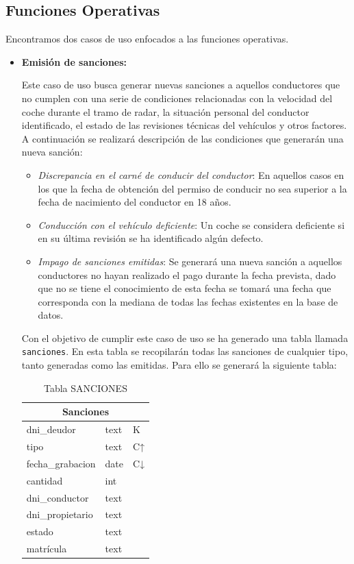 \documentclass[]{article}
\begin{document}
\subsection{Funciones Operativas}
\label{subsec:funciones_operativas}

Encontramos dos casos de uso enfocados a las funciones operativas.
\begin{itemize}
    \item \textbf{Emisión de sanciones:}
    
    Este caso de uso busca generar nuevas sanciones a aquellos conductores que no cumplen con una serie de condiciones relacionadas con la velocidad del coche durante el tramo de radar, la situación personal del conductor identificado, el estado de las revisiones técnicas del vehículos y otros factores.
    A continuación se realizará descripción de las condiciones que generarán una nueva sanción:
    \begin{itemize}
        \item \textit{Discrepancia en el carné de conducir del conductor}: En aquellos casos en los que la fecha de obtención del permiso de conducir no sea superior a la fecha de nacimiento del conductor en 18 años.
        \item \textit{Conducción con el vehículo deficiente}: Un coche se considera deficiente si en su última revisión se ha identificado algún defecto. 
        \item \textit{Impago de sanciones emitidas}: Se generará una nueva sanción a aquellos conductores no hayan realizado el pago durante la fecha prevista, dado que no se tiene el conocimiento de esta fecha se tomará una fecha que corresponda con la mediana de todas las fechas existentes en la base de datos.
    \end{itemize}

    Con el objetivo de cumplir este caso de uso se ha generado una tabla llamada \texttt{sanciones}. En esta tabla se recopilarán todas las sanciones de cualquier tipo, tanto generadas como las emitidas. Para ello se generará la siguiente tabla:
\begin{table}[H]
    \centering
    \begin{tabular}{lll} 
        \toprule
        \multicolumn{3}{c}{\large\textbf{Sanciones}} \\ 
        \midrule
        dni\_deudor      & text & K \\
        tipo             & text & C↑\\
        fecha\_grabacion & date & C↓\\
        cantidad         & int  &   \\
        dni\_conductor   & text &   \\
        dni\_propietario & text &   \\
        estado           & text &   \\
        matrícula        & text &   \\
        \bottomrule
    \end{tabular}
    \caption {Tabla SANCIONES}
 \end{table}


\end{itemize}
\end{document}
